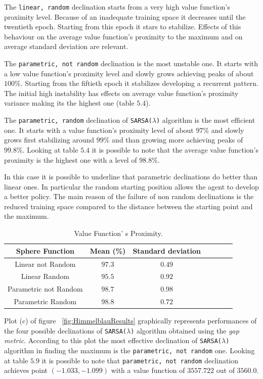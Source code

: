 The {\tt linear, random} declination starts from a very high value function's proximity level. Because of an inadequate training space it decreases until the twentieth epoch. Starting from this epoch it stars to stabilize. Effects of this behaviour on the average value function's proximity to the maximum and on average standard deviation are relevant.
 
The {\tt parametric, not random} declination is the most unstable one. It starts with a low value function's proximity level and slowly grows achieving peaks of about $100\%$. Starting from the fiftieth epoch it stabilizes developing a recurrent pattern. The initial high instability has effects on average value function's proximity variance making its the highest one (table $5.4$).
 
The {\tt parametric, random} declination of {\tt SARSA($\lambda$)} algorithm is the most efficient one. It starts with a value function's proximity level of about $97\%$ and slowly grows first stabilizing around $99\%$ and than growing more achieving peaks of $99.8\%$. Looking at table $5.4$ it is possible to note that the average value function's proximity is the highest one with a level of $98.8\%$.
 
In this case it is possible to underline that parametric declinations do better than linear ones. In particular the random starting position allows the agent to develop a better policy. The main reason of the failure of non random declinations is the reduced training space compared to the distance between the starting point and the maximum.

\begin{table}[h!]
	\centering
	\resizebox{\linewidth}{!} {
	\begin{tabular}{c| cccccc} 
		\hline \textbf{Sphere Function}
		& \textbf{Mean (\%)} & \textbf{Standard deviation} \\ 
		\hline Linear not Random
		& $97.3$ & \cellcolor{green!25}$0.49$ \\ 
		\hline Linear Random
		& $95.5$ & $0.92$ \\ 
		\hline Parametric not Random
		& $98.7$ & $0.98$ \\ 
		\hline Parametric Random
		& \cellcolor{green!25}$98.8$ & $0.72$ \\ 
		\hline 
	\end{tabular} 
}
\label{ParabolicTabProximity}
\caption{Value Function' s Proximity.} 
\end{table}

Plot (c) of figure ~\ref{fig:HimmelblauResults} graphically represents performances of the four possible declinations of {\tt SARSA($\lambda$)} algorithm obtained using the \textit{gap metric}. According to this plot the most effective declination of {\tt SARSA($\lambda$)} algorithm in finding the maximum is the {\tt parametric, not random} one. Looking at table $5.9$ it is possible to note that {\tt parametric, not random} declination achieves point $(-1.033, -1.099)$ with a value function of $3557.722$ out of $3560.0$.

